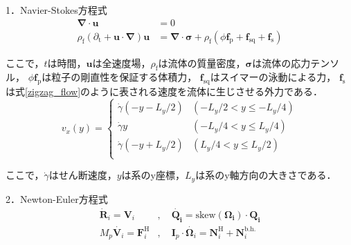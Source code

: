 \documentclass[twocolumns,10pt,a4j]{jarticle}
\begin{document}
\par
1．Navier-Stokes方程式\\
  \vspace{-3truemm}
  \small
  \begin{equation}
    \begin{split}
      \boldsymbol{\nabla}\cdot\boldsymbol{u} &= 0 \\
      \rho_\mathrm{f} \left(\partial_\mathrm{t} + \boldsymbol{u} \cdot \boldsymbol{\nabla} \right) \boldsymbol{u} &= \boldsymbol{\nabla} \cdot \boldsymbol{\sigma} + \rho_\mathrm{f} \left( \phi \boldsymbol{f}_\mathrm{p} + \boldsymbol{f}_\mathrm{sq} + \boldsymbol{f}_\mathrm{s} \right)
    \end{split}
    \label{Navier_Stokes}
  \end{equation}
  \normalsize
  \vspace{-4truemm}

  \noindent
ここで，$t$は時間，$\boldsymbol{u}$は全速度場，$\rho_\mathrm{f}$は流体の質量密度，$\boldsymbol{\sigma}$は流体の応力テンソル，
$\phi \boldsymbol{f}_\mathrm{p}$は粒子の剛直性を保証する体積力，
$\boldsymbol{f}_\mathrm{sq}$はスイマーの泳動による力，
$\boldsymbol{f}_\mathrm{s}$は式\eqref{zigzag_flow}のように表される速度を流体に生じさせる外力である．
  \vspace{-3truemm}
  \small
  \begin{equation}
    v_x(y) =
    \begin{cases}
      \dot{\gamma} (-y - L_y/2) & (-L_y/2 < y \le -L_y/4) \\
      \dot{\gamma} y            & (-L_y/4 < y \le L_y/4) \\
      \dot{\gamma} (-y + L_y/2) & (L_y/4 < y \le L_y/2)\\
    \end{cases}
    \label{zigzag_flow}
  \end{equation}
  \normalsize
  \vspace{-4truemm}

  \noindent
 ここで，$\dot{\gamma}$はせん断速度，$y$は系のy座標，$L_y$は系のy軸方向の大きさである．

  \par
2．Newton-Euler方程式\\
  \vspace{-4truemm}
  \small
  \begin{equation}
    \begin{split}
      \dot{\boldsymbol{R}}_i = \boldsymbol{V}_i &, \quad \boldsymbol{\dot{Q_i}} = \mathrm{skew} (\boldsymbol{\Omega_i}) \cdot \boldsymbol{Q_i} \\
      M_p \dot{\boldsymbol{V}_i} = \boldsymbol{F}_i^\mathrm{H} &, \quad
      \boldsymbol{I}_p \cdot \dot{\boldsymbol{\Omega}_i} = \boldsymbol{N}_i^\mathrm{H} + \boldsymbol{N}_i^\mathrm{b.h.}
    \end{split}
    \label{Newton_Euler}
  \end{equation}
  \normalsize
  \vspace{-4truemm}
\end{document}
